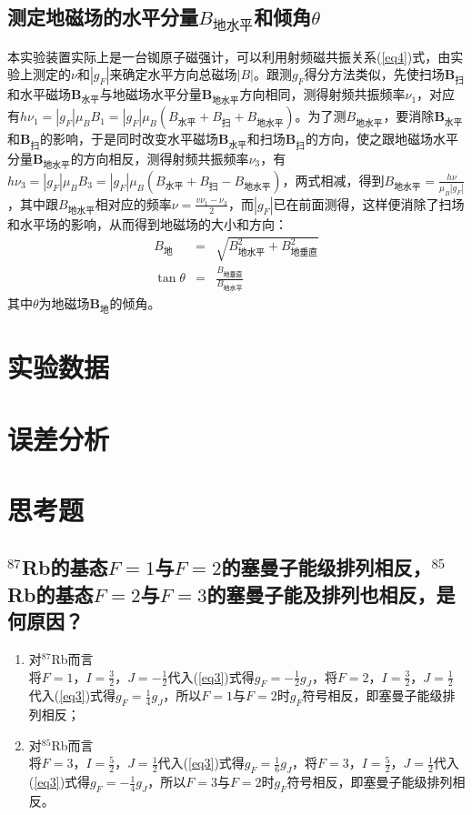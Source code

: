 \documentclass[a4paper]{article}
\begin{document}
\subsection{测定地磁场的水平分量$B_{\text{地水平}}$和倾角$\theta$}
本实验装置实际上是一台铷原子磁强计，可以利用射频磁共振关系(\ref{eq4})式，由实验上测定的$\nu$和$|g_F|$来确定水平方向总磁场$|B|$。跟测$g_F$得分方法类似，先使扫场$\bm{B}_{\text{扫}}$和水平磁场$\bm{B}_{\text{水平}}$与地磁场水平分量$\bm{B}_{\text{地水平}}$方向相同，测得射频共振频率$\nu_1$，对应有$h\nu_1 = |g_F|\mu_BB_1 = |g_F|\mu_B(B_{\text{水平}} + B_{\text{扫}} + B_{\text{地水平}})$。为了测$B_{\text{地水平}}$，要消除$\bm{B}_{\text{水平}}$和$\bm{B}_{\text{扫}}$的影响，于是同时改变水平磁场$\bm{B}_{\text{水平}}$和扫场$\bm{B}_{\text{扫}}$的方向，使之跟地磁场水平分量$\bm{B}_{\text{地水平}}$的方向相反，测得射频共振频率$\nu_3$，有$h\nu_3 = |g_F|\mu_BB_3 = |g_F|\mu_B(B_{\text{水平}} + B_{\text{扫}} - B_{\text{地水平}})$，两式相减，得到$B_{\text{地水平}} = \frac{h\nu}{\mu_B|g_F|}$，其中跟$B_{\text{地水平}}$相对应的频率$\nu = \frac{v\nu_1 - \nu_3}{2}$，而$|g_F|$已在前面测得，这样便消除了扫场和水平场的影响，从而得到地磁场的大小和方向：
\begin{eqnarray}
B_{\text{地}} &=& \sqrt{B^2_{\text{地水平}} + B^2_{\text{地垂直}}}\label{eq7}\\
\tan\theta &=& \frac{B_{\text{地垂直}}}{B_{\text{地水平}}}\label{eq8}
\end{eqnarray}
其中$\theta$为地磁场$\bm{B}_{\text{地}}$的倾角。

\section{实验数据}

\section{误差分析}

\section{思考题}
\subsection{$^{87}$Rb的基态$F=1$与$F=2$的塞曼子能级排列相反，$^{85}$Rb的基态$F=2$与$F=3$的塞曼子能及排列也相反，是何原因？}
\begin{enumerate}
\item 对$^{87}$Rb而言\\
将$F=1$，$I=\frac{3}{2}$，$J=-\frac{1}{2}$代入(\ref{eq3})式得$g_F=-\frac{1}{2}g_J$，将$F=2$，$I=\frac{3}{2}$，$J=\frac{1}{2}$代入(\ref{eq3})式得$g_F=\frac{1}{4}g_J$，所以$F=1$与$F=2$时$g_F$符号相反，即塞曼子能级排列相反；
\item 对$^{85}$Rb而言\\
将$F=3$，$I=\frac{5}{2}$，$J=\frac{1}{2}$代入(\ref{eq3})式得$g_F=\frac{1}{6}g_J$，将$F=3$，$I=\frac{5}{2}$，$J=\frac{1}{2}$代入(\ref{eq3})式得$g_F=-\frac{1}{4}g_J$，所以$F=3$与$F=2$时$g_F$符号相反，即塞曼子能级排列相反。
\end{enumerate}
\end{document}
